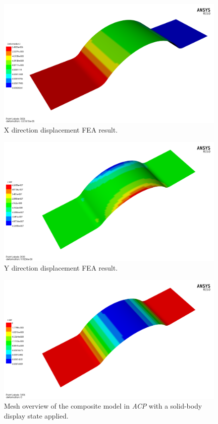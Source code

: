 \begin{figure}[htp]
\centering
\includegraphics[width=1\textwidth]{./figures/fea/fea-acp-x-def}
\caption{X direction displacement FEA result.}
\label{fig:fea-acp-x-def}
\end{figure}

\begin{figure}[htp]
\centering
\includegraphics[width=1\textwidth]{./figures/fea/fea-acp-y-def}
\caption{Y direction displacement FEA result.}
\label{fig:fea-acp-y-def}
\end{figure}

\begin{figure}[htp]
\centering
\includegraphics[width=1\textwidth]{./figures/fea/fea-acp-z-def}
\caption{Mesh overview of the composite model in \textit{ACP} with a solid-body display state applied.}
\label{fig:fea-acp-z-def}
\end{figure}

